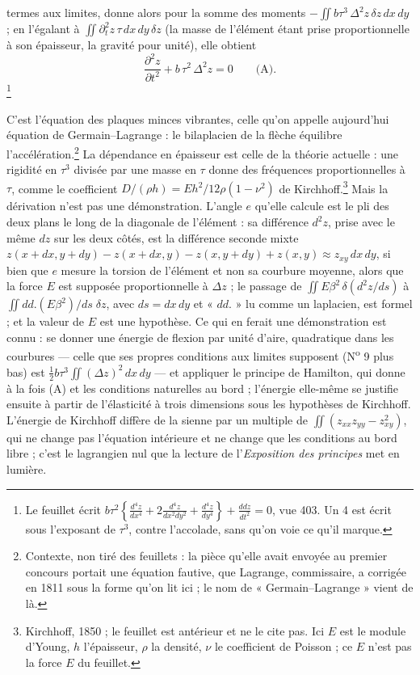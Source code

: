 \documentclass[11pt,a4paper]{article}
\begin{document}
termes aux limites, donne alors pour la somme des moments
$-\iint b\tau^3\,\Delta^2 z\,\delta z\,dx\,dy$ ; en l'égalant à
$\iint \partial_t^2 z\,\tau\,dx\,dy\,\delta z$ (la masse de l'élément étant prise
proportionnelle à son épaisseur, la gravité pour unité), elle obtient
\[
\frac{\partial^2 z}{\partial t^2} + b\,\tau^2\,\Delta^2 z = 0 \qquad \text{(A)}.
\]
\footnote{Le feuillet écrit
$b\tau^2\left\{\frac{d^4z}{dx^4}+2\frac{d^4z}{dx^2dy^2}+\frac{d^4z}{dy^4}\right\}+\frac{ddz}{dt^2} = 0$,
vue 403. Un 4 est écrit sous l'exposant de $\tau^3$, contre l'accolade, sans qu'on
voie ce qu'il marque.}

C'est l'équation des plaques minces vibrantes, celle qu'on appelle aujourd'hui
équation de Germain--Lagrange : le bilaplacien de la flèche équilibre
l'accélération.\footnote{Contexte, non tiré des feuillets : la pièce qu'elle avait
envoyée au premier concours portait une équation fautive, que Lagrange, commissaire, a
corrigée en 1811 sous la forme qu'on lit ici ; le nom de « Germain--Lagrange » vient de
là.} La dépendance en épaisseur est celle de la théorie actuelle : une rigidité en
$\tau^3$ divisée par une masse en $\tau$ donne des fréquences proportionnelles à
$\tau$, comme le coefficient $D/(\rho h) = Eh^2/12\rho(1-\nu^2)$ de
Kirchhoff.\footnote{Kirchhoff, 1850 ; le feuillet est antérieur et ne le cite pas.
Ici $E$ est le module d'Young, $h$ l'épaisseur, $\rho$ la densité, $\nu$ le coefficient
de Poisson ; ce $E$ n'est pas la force $E$ du feuillet.} Mais la dérivation n'est pas
une démonstration. L'angle $e$ qu'elle calcule est le pli des deux plans le long de la
diagonale de l'élément : sa différence $d^2z$, prise avec le même $dz$ sur les deux
côtés, est la différence seconde mixte
$z(x+dx,y+dy) - z(x+dx,y) - z(x,y+dy) + z(x,y) \approx z_{xy}\,dx\,dy$, si bien que $e$
mesure la torsion de l'élément et non sa courbure moyenne, alors que la force $E$ est
supposée proportionnelle à $\Delta z$ ; le passage de
$\iint E\beta^2\,\delta(d^2z/ds)$ à $\iint dd.(E\beta^2)/ds\;\delta z$, avec
$ds = dx\,dy$ et « $dd.$ » lu comme un laplacien, est formel ; et la valeur de $E$ est
une hypothèse. Ce qui en ferait une démonstration est connu : se donner une énergie de
flexion par unité d'aire, quadratique dans les courbures — celle que ses propres
conditions aux limites supposent (N\textsuperscript{o} 9 plus bas) est
$\frac12 b\tau^3\iint(\Delta z)^2\,dx\,dy$ — et appliquer le principe de Hamilton, qui
donne à la fois (A) et les conditions naturelles au bord ; l'énergie elle-même se
justifie ensuite à partir de l'élasticité à trois dimensions sous les hypothèses de
Kirchhoff. L'énergie de Kirchhoff diffère de la sienne par un multiple de
$\iint(z_{xx}z_{yy} - z_{xy}^2)$, qui ne change pas l'équation intérieure et ne change
que les conditions au bord libre ; c'est le lagrangien nul que la lecture de
l'\emph{Exposition des principes} met en lumière.
\end{document}
